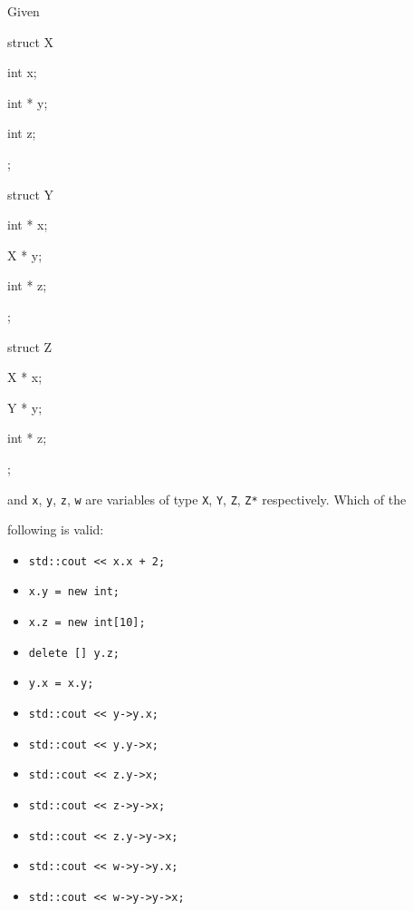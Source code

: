 Given



\begin{consolethree}[escapeinside=||]

struct X

{

    int x;

    int * y;

    int z;

};



struct Y

{

    int * x;

    X * y;

    int * z;

};



struct Z

{

    X * x;

    Y * y;

    int * z;

};

\end{consolethree}



and \texttt{x}, \texttt{y}, \texttt{z}, \texttt{w} are variables of type \texttt{X}, \texttt{Y}, \texttt{Z}, \texttt{Z*} respectively. Which of the

following is valid:

\begin{itemize}

\item \verb!std::cout << x.x + 2;!

\item \verb!x.y = new int;!

\item \verb!x.z = new int[10];!

\item \verb!delete [] y.z;!

\item \verb!y.x = x.y;!

\item \verb!std::cout << y->y.x;!

\item \verb!std::cout << y.y->x;!

\item \verb!std::cout << z.y->x;!

\item \verb!std::cout << z->y->x;!

\item \verb!std::cout << z.y->y->x;!

\item \verb!std::cout << w->y->y.x;!

\item \verb!std::cout << w->y->y->x;!

\end{itemize}

